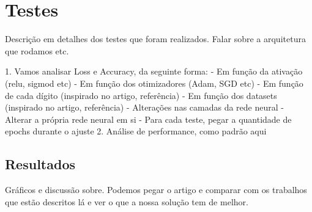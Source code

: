 \section{Testes}
Descrição em detalhes dos testes que foram realizados.
Falar sobre a arquitetura que rodamos etc.

1. Vamos analisar Loss e Accuracy, da seguinte forma:
    - Em função da ativação (relu, sigmod etc)
    - Em função dos otimizadores (Adam, SGD etc)
    - Em função de cada dígito (inspirado no artigo, referência)
    - Em função dos datasets (inspirado no artigo, referência)
    - Alterações nas camadas da rede neural
    - Alterar a própria rede neural em si
    - Para cada teste, pegar a quantidade de epochs durante o ajuste
2. Análise de performance, como padrão aqui

\subsection{Resultados}

Gráficos e discussão sobre. Podemos pegar o artigo \cite{noury2020deep} e comparar com os trabalhos que estão descritos lá e ver o que a nossa solução tem de melhor.


